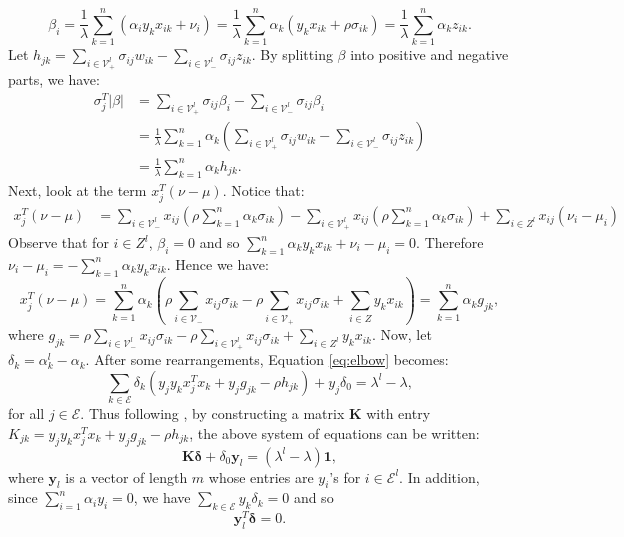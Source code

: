 \documentclass[10pt]{article}
\theoremstyle{definition}
\begin{document}
\[
\beta_i = \frac{1}{\lambda}\sum_{k=1}^n(\alpha_iy_kx_{ik}+\nu_i) =\frac{1}{\lambda}\sum_{k=1}^n\alpha_k(y_kx_{ik}+\rho\sigma_{ik})=\frac{1}{\lambda}\sum_{k=1}^n\alpha_kz_{ik}.\]
Let $h_{jk} = \sum_{i\in\mathcal V_+^l}\sigma_{ij}w_{ik} - \sum_{i\in\mathcal V_-^l}\sigma_{ij}z_{ik}$. By splitting $\beta$ into positive and negative parts, we have:
\[
\begin{array}{rl}
\sigma_j^T|\beta| &= \sum_{i\in\mathcal V_+^l}\sigma_{ij}\beta_{i} - \sum_{i\in\mathcal V_-^l}\sigma_{ij}\beta_{i} \\
&=\frac{1}{\lambda}\sum_{k=1}^n\alpha_k(\sum_{i\in\mathcal V_+^l}\sigma_{ij}w_{ik} - \sum_{i\in\mathcal V_-^l}\sigma_{ij}z_{ik})\\
&=\frac{1}{\lambda}\sum_{k=1}^n\alpha_kh_{jk}.
\end{array}
\] 
Next, look at the term $x_j^T(\nu-\mu)$. Notice that:
\[
\begin{array}{rl}
x_j^T(\nu-\mu) %
& = \sum_{i\in\mathcal V_-^l}x_{ij}(\rho\sum_{k=1}^n\alpha_k\sigma_{ik}) - \sum_{i\in\mathcal V_+^l}x_{ij}(\rho\sum_{k=1}^n\alpha_k\sigma_{ik}) + \sum_{i\in Z^l}x_{ij}(\nu_i-\mu_i)
\end{array}
\]
Observe that for $i\in Z^l$, $\beta_i=0$ and so $\sum_{k=1}^n\alpha_ky_kx_{ik}+\nu_i-\mu_i=0$. Therefore $\nu_i-\mu_i = -\sum_{k=1}^n\alpha_ky_kx_{ik}$. Hence we have:
\[
x_j^T(\nu-\mu) = \sum_{k=1}^n\alpha_k(\rho\sum_{i\in\mathcal V_-}x_{ij}\sigma_{ik}-\rho\sum_{i\in\mathcal V_+}x_{ij}\sigma_{ik}+\sum_{i\in Z}y_kx_{ik}) = \sum_{k=1}^n\alpha_k g_{jk},
\]
where $g_{jk}=\rho\sum_{i\in\mathcal V_-^l}x_{ij}\sigma_{ik}-\rho\sum_{i\in\mathcal V_+^l}x_{ij}\sigma_{ik}+\sum_{i\in Z^l}y_kx_{ik}$. Now, let $\delta_k = \alpha_k^l-\alpha_k$. After some rearrangements, Equation \eqref{eq:elbow} becomes:
\[
\sum_{k\in\mathcal E}\delta_k(y_jy_kx_j^Tx_k + y_j g_{jk} - \rho h_{jk}) + y_j\delta_0 = \lambda^l-\lambda,
\]
for all $j\in\mathcal E$. Thus following \cite{hastie2004entire}, by constructing a matrix $\mathbf{K}$ with entry $K_{jk} = y_jy_kx_j^Tx_k + y_j g_{jk} - \rho h_{jk}$, the above system of equations can be written:
\[
\mathbf{K}\boldsymbol{\delta} + \delta_0 \mathbf{y}_l = (\lambda^l-\lambda)\textbf{1},
\]
where $\mathbf{y}_l$ is a vector of length $m$ whose entries are $y_i$'s for $i\in \mathcal E^l$. In addition, since $\sum_{i=1}^n \alpha_iy_i = 0$, we have $\sum_{k\in\mathcal E}y_k\delta_k=0$ and so
\[\mathbf{y}_l^T\boldsymbol{\delta}=0.\]
\end{document}
